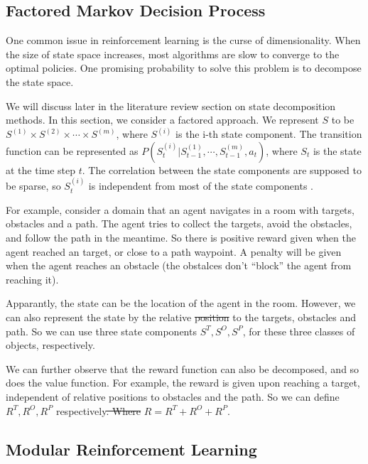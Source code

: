 \documentclass[12pt]{report}	%
\theoremstyle{definition}
\theoremstyle{remark}
\providecommand{\DIFadd}[1]{{\protect\color{blue}\uwave{#1}}} %
\providecommand{\DIFdel}[1]{{\protect\color{red}\sout{#1}}}                      %
\providecommand{\DIFaddbegin}{} %
\providecommand{\DIFaddend}{} %
\providecommand{\DIFdelbegin}{} %
\providecommand{\DIFdelend}{} %
\begin{document}
\subsection{Factored Markov Decision Process}

One common issue in reinforcement learning is the curse of dimensionality. 
When the size of state space increases, most algorithms are slow to 
converge to the optimal policies. One promising probability to solve this
problem is to decompose the state space. 

We will discuss later in the literature review section on state decomposition
methods.
In this section, we consider a factored approach.
We represent $S$ to be $S^{(1)} \times S^{(2)} \times \cdots \times S^{(m)}$,
where $S^{(i)}$ is the i-th state component. The transition function can be
represented as $P(S_t^{(i)}|S_{t-1}^{(1)}, \cdots, S_{t-1}^{(m)}, a_t)$, where
$S_t$ is the state at the time step $t$. The correlation between the state
components are supposed to be sparse, so $S_t^{(i)}$  is independent from most
of the state components \DIFaddbegin \DIFadd{in $S_{t-1}^{(1)}, \cdots, S_{t-1}^{(m)}$ }\DIFaddend \cite{jonsson2005causal}.

For example, consider a domain that an agent navigates in a room with targets,
obstacles and a path. The agent tries to collect the targets, avoid the
obstacles, and follow the path in the meantime. So there is positive reward
given when the agent reached an target, or close to a path waypoint. A penalty
will be given when the agent reaches an obstacle (the obstalces don't ``block''
the agent from reaching it).

Apparantly, the state can be the location
of the agent in the room. However, we can also represent the state by the
relative \DIFdelbegin \DIFdel{position }\DIFdelend \DIFaddbegin \DIFadd{positions }\DIFaddend to the targets, obstacles and path. So we can use three state
components $S^T, S^O, S^P$, for these three classes of objects, respectively.

We can further observe that the reward function can also be decomposed, and
so does the value function. For example, the reward is given upon reaching a
target, independent of relative positions to obstacles and the path. So we can
define $R^T, R^O, R^P$ respectively\DIFdelbegin \DIFdel{. Where }\DIFdelend \DIFaddbegin \DIFadd{, where }\DIFaddend $R = R^T + R^O + R^P$.

\subsection{Modular Reinforcement Learning}
\end{document}
